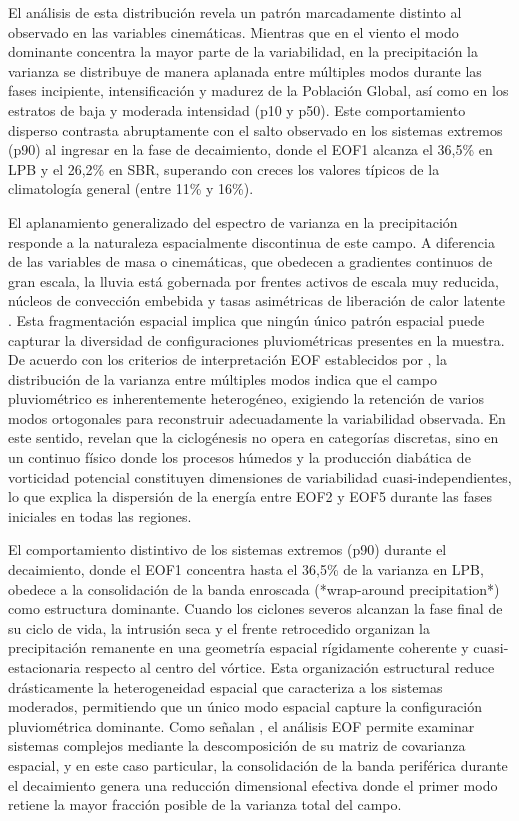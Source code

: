 El análisis de esta distribución revela un patrón marcadamente distinto al observado en las variables cinemáticas. Mientras que en el viento el modo dominante concentra la mayor parte de la variabilidad, en la precipitación la varianza se distribuye de manera aplanada entre múltiples modos durante las fases incipiente, intensificación y madurez de la Población Global, así como en los estratos de baja y moderada intensidad (p10 y p50). Este comportamiento disperso contrasta abruptamente con el salto observado en los sistemas extremos (p90) al ingresar en la fase de decaimiento, donde el EOF1 alcanza el 36,5\% en LPB y el 26,2\% en SBR, superando con creces los valores típicos de la climatología general (entre 11\% y 16\%).

El aplanamiento generalizado del espectro de varianza en la precipitación responde a la naturaleza espacialmente discontinua de este campo. A diferencia de las variables de masa o cinemáticas, que obedecen a gradientes continuos de gran escala, la lluvia está gobernada por frentes activos de escala muy reducida, núcleos de convección embebida y tasas asimétricas de liberación de calor latente \citep{oertel2021warm}. Esta fragmentación espacial implica que ningún único patrón espacial puede capturar la diversidad de configuraciones pluviométricas presentes en la muestra. De acuerdo con los criterios de interpretación EOF establecidos por \citet{hannachi2007empirical}, la distribución de la varianza entre múltiples modos indica que el campo pluviométrico es inherentemente heterogéneo, exigiendo la retención de varios modos ortogonales para reconstruir adecuadamente la variabilidad observada. En este sentido, \citet{graf2017objective} revelan que la ciclogénesis no opera en categorías discretas, sino en un continuo físico donde los procesos húmedos y la producción diabática de vorticidad potencial constituyen dimensiones de variabilidad cuasi-independientes, lo que explica la dispersión de la energía entre EOF2 y EOF5 durante las fases iniciales en todas las regiones.

El comportamiento distintivo de los sistemas extremos (p90) durante el decaimiento, donde el EOF1 concentra hasta el 36,5\% de la varianza en LPB, obedece a la consolidación de la banda enroscada (*wrap-around precipitation*) como estructura dominante. Cuando los ciclones severos alcanzan la fase final de su ciclo de vida, la intrusión seca y el frente retrocedido organizan la precipitación remanente en una geometría espacial rígidamente coherente y cuasi-estacionaria respecto al centro del vórtice. Esta organización estructural reduce drásticamente la heterogeneidad espacial que caracteriza a los sistemas moderados, permitiendo que un único modo espacial capture la configuración pluviométrica dominante. Como señalan \citet{hannachi2023eof}, el análisis EOF permite examinar sistemas complejos mediante la descomposición de su matriz de covarianza espacial, y en este caso particular, la consolidación de la banda periférica durante el decaimiento genera una reducción dimensional efectiva donde el primer modo retiene la mayor fracción posible de la varianza total del campo.

